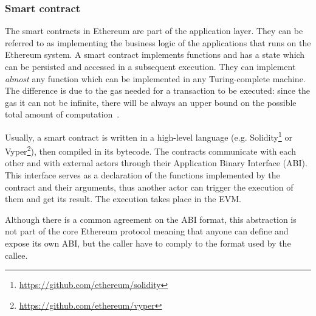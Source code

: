 \subsubsection{Smart contract}
\label{sec:smart-contract}

The smart contracts in Ethereum are part of the application layer. They can be
referred to as implementing the business logic of the applications that runs on
the Ethereum system. A smart contract implements functions and has a state which
can be persisted and accessed in a subsequent execution. They can implement
\emph{almost} any function which can be implemented in any Turing-complete
machine. The difference is due to the gas needed for a transaction to be
executed: since the gas it can not be infinite, there will be always an upper
bound on the possible total amount of computation~\cite{wood2018ethereum}.

Usually, a smart contract is written in a high-level language (e.g.
Solidity\footnote{\url{https://github.com/ethereum/solidity}} or
Vyper\footnote{\url{https://github.com/ethereum/vyper}}), then compiled in its
bytecode. The contracts communicate with each other and with external actors
through their Application Binary Interface (ABI). This interface serves as a
declaration of the functions implemented by the contract and their arguments,
thus another actor can trigger the execution of them and get its result. The
execution takes place in the EVM.

Although there is a common agreement on the ABI format, this abstraction is not
part of the core Ethereum protocol meaning that anyone can define and expose its
own ABI, but the caller have to comply to the format used by the callee.

